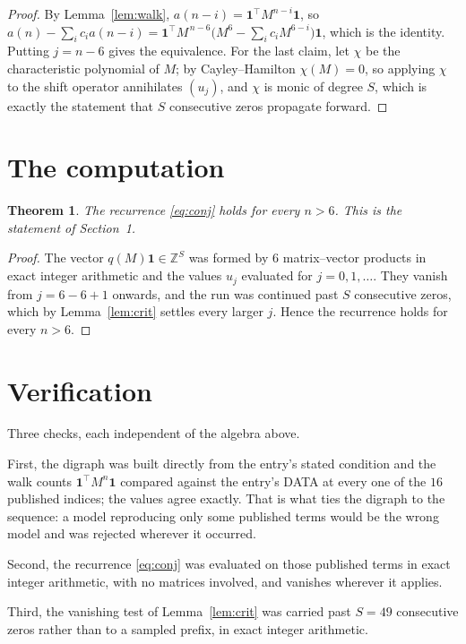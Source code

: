 \documentclass[11pt,a4paper]{article}
\theoremstyle{plain}
\newtheorem{theorem}{Theorem}
\theoremstyle{definition}
\begin{document}
\begin{proof}
By Lemma~\ref{lem:walk}, $a(n-i)=\mathbf{1}^{\!\top}M^{n-i}\mathbf{1}$, so
$a(n)-\sum_i c_i a(n-i)
=\mathbf{1}^{\!\top}M^{\,n-6}\bigl(M^{6}-\sum_i c_i M^{6-i}\bigr)
\mathbf{1}$, which is the identity. Putting $j=n-6$ gives the equivalence. For the
last claim, let $\chi$ be the characteristic polynomial of $M$; by Cayley--Hamilton
$\chi(M)=0$, so applying $\chi$ to the shift operator annihilates $(u_j)$, and $\chi$ is
monic of degree $S$, which is exactly the statement that $S$ consecutive zeros propagate
forward.
\end{proof}

\section{The computation}

\begin{theorem}
The recurrence \eqref{eq:conj} holds for every $n>6$. This is the statement of
Section~1.
\end{theorem}

\begin{proof}
The vector $q(M)\mathbf{1}\in\mathbb{Z}^{S}$ was formed by $6$ matrix--vector
products in exact integer arithmetic and the values $u_j$ evaluated for
$j=0,1,\dots$. They vanish from $j=6-6+1$ onwards, and the run was continued past
$S$ consecutive zeros, which by Lemma~\ref{lem:crit} settles every larger $j$. Hence the
recurrence holds for every $n>6$.
\end{proof}

\section{Verification}

Three checks, each independent of the algebra above.

First, the digraph was built directly from the entry's stated condition and the walk counts
$\mathbf{1}^{\!\top}M^{n}\mathbf{1}$ compared against the entry's DATA at every one of
the $16$ published indices; the values agree exactly. That is what ties the digraph to
the sequence: a model reproducing only some published terms would be the wrong model and
was rejected wherever it occurred.

Second, the recurrence \eqref{eq:conj} was evaluated on those published terms in exact
integer arithmetic, with no matrices involved, and vanishes wherever it applies.

Third, the vanishing test of Lemma~\ref{lem:crit} was carried past $S=49$ consecutive
zeros rather than to a sampled prefix, in exact integer arithmetic.
\end{document}
